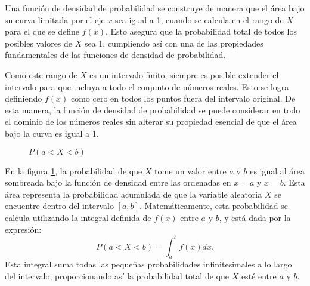 \newpage

Una función de densidad de probabilidad se construye de manera que el área bajo su curva limitada por el eje $x$ sea igual a 1, cuando se calcula en el rango de $X$ para el que se define $f(x)$. Esto asegura que la probabilidad total de todos los posibles valores de $X$ sea 1, cumpliendo así con una de las propiedades fundamentales de las funciones de densidad de probabilidad.

Como este rango de $X$ es un intervalo finito, siempre es posible extender el intervalo para que incluya a todo el conjunto de números reales. Esto se logra definiendo $f(x)$ como cero en todos los puntos fuera del intervalo original. De esta manera, la función de densidad de probabilidad se puede considerar en todo el dominio de los números reales sin alterar su propiedad esencial de que el área bajo la curva es igual a 1.
\begin{figure}[h!]
    \centering
    \caption{$P(a < X < b)$}
    \label{fig:prob_densidad}
\end{figure}

En la figura \ref{fig:prob_densidad}, la probabilidad de que $X$ tome un valor entre $a$ y $b$ es igual al área sombreada bajo la función de densidad entre las ordenadas en $x = a$ y $x = b$. Esta área representa la probabilidad acumulada de que la variable aleatoria $X$ se encuentre dentro del intervalo $[a, b]$. Matemáticamente, esta probabilidad se calcula utilizando la integral definida de $f(x)$ entre $a$ y $b$, y está dada por la expresión:
$$P(a < X < b) = \int_a^b f(x) dx.$$
Esta integral suma todas las pequeñas probabilidades infinitesimales a lo largo del intervalo, proporcionando así la probabilidad total de que $X$ esté entre $a$ y $b$.

